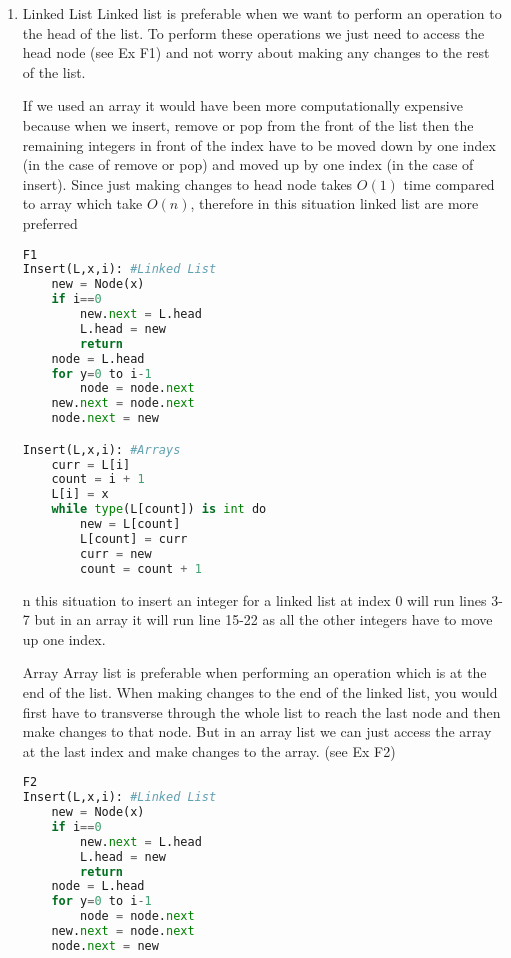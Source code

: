 \documentclass{article}
\begin{document}
\begin{enumerate}[label=(\alph*)]
\item 
\newline
Linked List
\newline
Linked list is preferable when we want to perform an operation to the head of the list. To perform these operations we just need to access the head node (see Ex F1) and not worry about making any changes to the rest of the list.

If we used an array it would have been more computationally expensive because when we insert, remove or pop from the front of the list then the remaining integers in front of the index have to be moved down by one index (in the case of remove or pop) and moved up by one index (in the case of insert). Since just making changes to head node takes $O(1)$ time compared to array which take $O(n)$, therefore in this situation linked list are more preferred
\begin{lstlisting}[language=Python]
F1
Insert(L,x,i): #Linked List
    new = Node(x)
    if i==0
        new.next = L.head
        L.head = new
        return
    node = L.head
    for y=0 to i-1
        node = node.next
    new.next = node.next
    node.next = new

Insert(L,x,i): #Arrays
    curr = L[i]
    count = i + 1
    L[i] = x
    while type(L[count]) is int do
        new = L[count]
        L[count] = curr
        curr = new
        count = count + 1 
\end{lstlisting}

\begin{SCfigure}
  \caption In this situation to insert an integer for a linked list at index 0 will run lines 3-7 but in an array it will run line 15-22 as all the other integers have to move up one index.
\end{SCfigure}

\vspace{5mm} 
Array
\newline
Array list is preferable when performing an operation which is at the end of the list. When making changes to the end of the linked list, you would first have to transverse through the whole list to reach the last node and then make changes to that node. But in an array list we can just access the array at the last index and make changes to the array. (see Ex F2)
\begin{lstlisting}[language=Python]
F2
Insert(L,x,i): #Linked List
    new = Node(x)
    if i==0
        new.next = L.head
        L.head = new
        return
    node = L.head
    for y=0 to i-1
        node = node.next
    new.next = node.next
    node.next = new


\end{lstlisting}
\end{enumerate}
\end{document}
